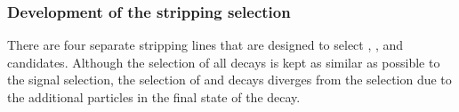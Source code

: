 \subsubsection{Development of the stripping selection}
\label{strippingold}






There are four separate stripping lines that are designed to select \bmumu, \bujpsik, \bsjpsiphi and \bhh candidates. Although the selection of all decays is kept as similar as possible to the signal selection, the selection of \bujpsik and \bsjpsiphi decays diverges from the \bmumu selection due to the additional particles in the final state of the decay. 

